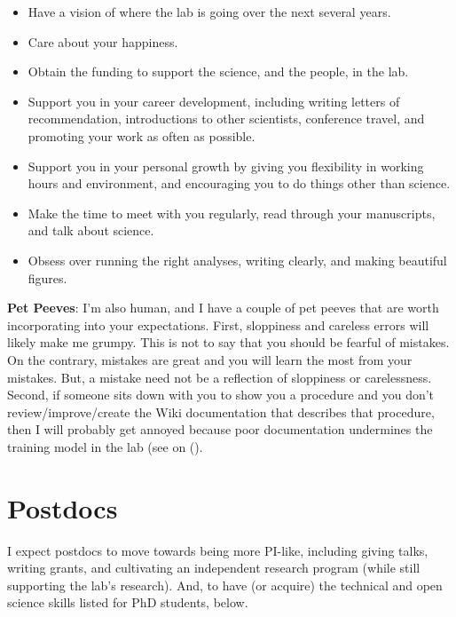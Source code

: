 \documentclass[letterpaper,12pt,oneside]{memoir}
\begin{document}
\begin{itemize}
\item Have a vision of where the lab is going over the next several years.
\item Care about your happiness.
\item Obtain the funding to support the science, and the people, in the lab.
\item Support you in your career development, including writing letters of recommendation, introductions to other scientists, conference travel, and promoting your work as often as possible.
\item Support you in your personal growth by giving you flexibility in working hours and environment, and encouraging you to do things other than science.
\item Make the time to meet with you regularly, read through your manuscripts, and talk about science.
\item Obsess over running the right analyses, writing clearly, and making beautiful figures.
\end{itemize}

\noindent \textbf{Pet Peeves}: I'm also human, and I have a couple of pet peeves that are worth incorporating into your expectations. First, sloppiness and careless errors will likely make me grumpy. This is not to say that you should be fearful of mistakes. On the contrary, mistakes are great and you will learn the most from your mistakes. But, a mistake need not be a reflection of sloppiness or carelessness. Second, if someone sits down with you to show you a procedure and you don't review/improve/create the Wiki documentation that describes that procedure, then I will probably get annoyed because poor documentation undermines the training model in the lab (see  on ().

\section{Postdocs}

I expect postdocs to move towards being more PI-like, including giving talks, writing grants, and cultivating an independent research program (while still supporting the lab's research). And, to have (or acquire) the technical and open science skills listed for PhD students, below.

\end{document}
